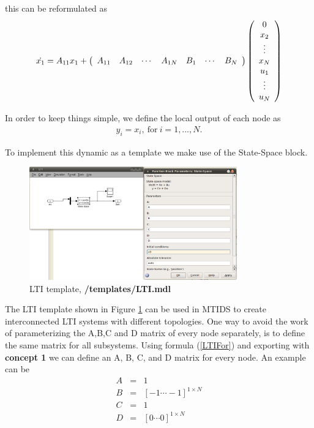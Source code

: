 \documentclass[a4paper,twoside, openright,12pt]{report}
\begin{document}
this can be reformulated as
\begin{eqnarray} \label{LTIFor}
 \dot{x_1}= A_{11}x_1 +  
\left( \begin{array}{c c c c c c c}
A_{11} & A_{12} & \cdots & A_{1N} & B_{1} & \cdots & B_{N}  
\end{array} \right) 
\left( \begin{array}{c}
0 \\ 
x_2 \\ 
\vdots \\
x_N\\
u_1 \\  
\vdots \\
u_N
\end{array} \right) 
\end{eqnarray}





In order to keep things simple, we define the local output of each node as
\begin{eqnarray}
 y_i=  x_i,\ \mbox{for}\ i=1,\ldots,N. 
\end{eqnarray}

To implement this dynamic as a template we make use of the State-Space block.

\begin{figure}[htb]
\centering
\includegraphics[width=0.8\textwidth]{pics/screenLTI.eps}
\caption[MTIDS LTI Template]{LTI template,  \textbf{/templates/LTI.mdl}}
\label{templateLTIFig}
\end{figure}
 
The LTI template shown in Figure \ref{templateLTIFig} can be used in MTIDS to create interconnected LTI systems with different topologies. One way to avoid 
the work of parameterizing the A,B,C and D matrix of every node separately, is to define the same matrix for all subsystems. Using formula 
(\ref{LTIFor}) and exporting with \textbf{concept 1} we can define an A, B, C, and D matrix for every node. An example can be
\begin{eqnarray}
 A&=& 1\nonumber\\
B&=&[-1 \cdots -1]^{1\times N}\nonumber\\
C&=& 1\nonumber\\
D&=& [0 \cdots 0] ^{1\times N}\nonumber
\end{eqnarray}
\end{document}
